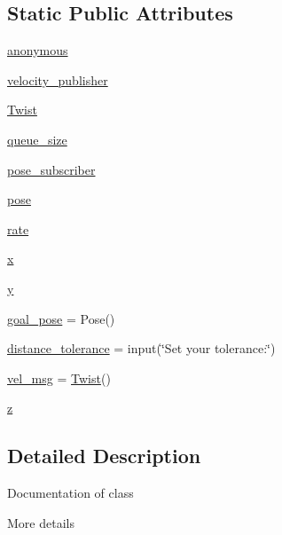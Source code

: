 \subsection*{Static Public Attributes}
\begin{DoxyCompactItemize}
\item 
\hyperlink{classgotogoal_1_1turtlebot_a8d9bc93bf763f964ba63bd3091d684f3}{anonymous}
\item 
\hyperlink{classgotogoal_1_1turtlebot_a9d26510d60f1910564e9a201b1461892}{velocity\+\_\+publisher}
\item 
\hyperlink{classgotogoal_1_1turtlebot_a6139a3b6b91a3bdfa3c48b724fc46d11}{Twist}
\item 
\hyperlink{classgotogoal_1_1turtlebot_a7b5a17eb28fb9720f0f2a9770b1db80b}{queue\+\_\+size}
\item 
\hyperlink{classgotogoal_1_1turtlebot_a7a2790c51dc3d072136b20c658211b5a}{pose\+\_\+subscriber}
\item 
\hyperlink{classgotogoal_1_1turtlebot_aa62da2a06a30d1f52868804b848ad7e4}{pose}
\item 
\hyperlink{classgotogoal_1_1turtlebot_a259bff54353bc7bdb8f3a00424f1bb7e}{rate}
\item 
\hyperlink{classgotogoal_1_1turtlebot_ad6b551134c3ffcf8b219a028bd9f6967}{x}
\item 
\hyperlink{classgotogoal_1_1turtlebot_a323496e4cd69a768268e1d0a11ec03ec}{y}
\item 
\hyperlink{classgotogoal_1_1turtlebot_a94012c2e05fac094807f73e99c9d6bcf}{goal\+\_\+pose} = Pose()
\item 
\hyperlink{classgotogoal_1_1turtlebot_a27d8db8e02fc4c5645333233f0330ec7}{distance\+\_\+tolerance} = input(\char`\"{}Set your tolerance\+:\char`\"{})
\item 
\hyperlink{classgotogoal_1_1turtlebot_aedd9b12311dd7793f4275407ace85d18}{vel\+\_\+msg} = \hyperlink{classgotogoal_1_1turtlebot_a6139a3b6b91a3bdfa3c48b724fc46d11}{Twist}()
\item 
\hyperlink{classgotogoal_1_1turtlebot_ae8b6f9346f749119194f003367d7c3bf}{z}
\end{DoxyCompactItemize}


\subsection{Detailed Description}
\begin{DoxyVerb}Documentation of class

More details
\end{DoxyVerb}
 

